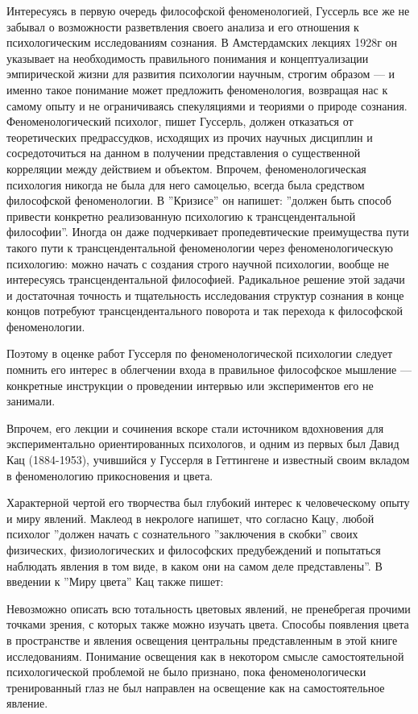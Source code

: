\documentclass[11pt]{book}
\begin{document}
Интересуясь в первую очередь философской феноменологией, Гуссерль все же не забывал о возможности разветвления своего анализа и его отношения к психологическим исследованиям сознания. В Амстердамских лекциях 1928г он указывает на необходимость правильного понимания и концептуализации эмпирической жизни для развития психологии научным, строгим образом --- и именно такое понимание может предложить феноменология, возвращая нас к самому опыту и не ограничиваясь спекуляциями и теориями о природе сознания. Феноменологический психолог, пишет Гуссерль, должен отказаться от теоретических предрассудков, исходящих из прочих научных дисциплин и сосредоточиться на данном в получении представления о существенной корреляции между действием и объектом. Впрочем, феноменологическая психология никогда не была для него самоцелью, всегда была средством философской феноменологии. В ''Кризисе'' он напишет: ''должен быть способ привести конкретно реализованную психологию к трансцендентальной философии''. Иногда он даже подчеркивает пропедевтические преимущества пути такого пути к трансцендентальной феноменологии через феноменологическую психологию: можно начать с создания строго научной психологии, вообще не интересуясь трансцендентальной философией. Радикальное решение этой задачи и достаточная точность и тщательность исследования структур сознания в конце концов потребуют трансцендентального поворота и так перехода к философской феноменологии.

Поэтому в оценке работ Гуссерля по феноменологической психологии следует помнить его интерес в облегчении входа в правильное философское мышление --- конкретные инструкции о проведении интервью или экспериментов его не занимали.

Впрочем, его лекции и сочинения вскоре стали источником вдохновения для экспериментально ориентированных психологов, и одним из первых был Давид Кац (1884-1953), учившийся у Гуссерля в Геттингене и известный своим вкладом в феноменологию прикосновения и цвета.

Характерной чертой его творчества был глубокий интерес к человеческому опыту и миру явлений. Маклеод в некрологе напишет, что согласно Кацу, любой психолог ''должен начать с сознательного ''заключения в скобки'' своих физических, физиологических и философских предубеждений и попытаться наблюдать явления в том виде, в каком они на самом деле представлены''. В введении к ''Миру цвета'' Кац также пишет:

\smallskip
{}\relax
{}\relax

Невозможно описать всю тотальность цветовых явлений, не пренебрегая прочими точками зрения, с которых также можно изучать цвета. Способы появления цвета в пространстве и явления освещения центральны представленным в этой книге исследованиям. Понимание освещения как в некотором смысле самостоятельной психологической проблемой не было признано, пока феноменологически тренированный глаз не был направлен на освещение как на самостоятельное явление.
\end{document}
